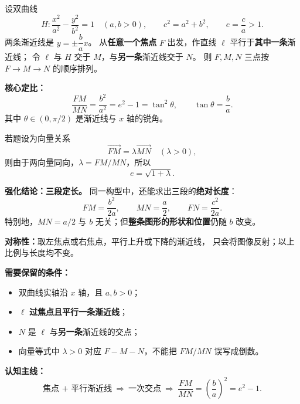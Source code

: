 \begin{statementbox}
设双曲线
\[
H:\frac{x^2}{a^2}-\frac{y^2}{b^2}=1\quad(a,b>0),\qquad
c^2=a^2+b^2,\qquad e=\frac ca>1.
\]
两条渐近线是 $y=\pm\dfrac ba x$。
从\textbf{任意一个焦点} $F$ 出发，作直线 $\ell$ 平行于\textbf{其中一条}渐近线；
令 $\ell$ 与 $H$ 交于 $M$，与\textbf{另一条}渐近线交于 $N$。
则 $F,M,N$ 三点按 $F\!\to\!M\!\to\!N$ 的顺序排列。

\textbf{核心定比：}
\[
\boxed{\frac{FM}{MN}=\frac{b^2}{a^2}=e^2-1
      =\tan^2\theta},\qquad \tan\theta=\frac ba.
\]
其中 $\theta\in(0,\pi/2)$ 是渐近线与 $x$ 轴的锐角。

\begin{center}\end{center}
\end{statementbox}
\clearpage
\begin{statementbox}
若题设为向量关系
\[
\overrightarrow{FM}=\lambda\overrightarrow{MN}\quad(\lambda>0),
\]
则由于两向量同向，$\lambda=FM/MN$，所以
\[
\boxed{e=\sqrt{1+\lambda}}.
\]


\textbf{强化结论：三段定长。}
同一构型中，还能求出三段的\textbf{绝对长度}：
\[
\boxed{FM=\frac{b^2}{2a}},\qquad
\boxed{MN=\frac a2},\qquad
\boxed{FN=\frac{c^2}{2a}}.
\]
特别地，$MN=a/2$ 与 $b$ 无关；但\textbf{整条图形的形状和位置}仍随 $b$ 改变。

\textbf{对称性：}取左焦点或右焦点，平行上升或下降的渐近线，
只会将图像反射；以上比例与长度均不变。

\textbf{需要保留的条件：}
\begin{itemize}
\item 双曲线实轴沿 $x$ 轴，且 $a,b>0$；
\item $\ell$ \textbf{过焦点且平行一条渐近线}；
\item $N$ 是 $\ell$ 与\textbf{另一条}渐近线的交点；
\item 向量等式中 $\lambda>0$ 对应 $F-M-N$，不能把 $FM/MN$ 误写成倒数。
\end{itemize}

\textbf{认知主线：}
\[
\boxed{\text{焦点 + 平行渐近线}}
\ \Longrightarrow\
\boxed{\text{一次交点}}
\ \Longrightarrow\
\boxed{\frac{FM}{MN}=\left(\frac ba\right)^2=e^2-1}.
\]
\end{statementbox}
